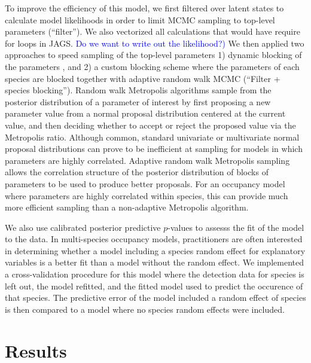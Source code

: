 \documentclass[12pt]{article}
\newcommand{\flagged}[1] {
  \textcolor{blue}{#1}
}
\begin{document}
To improve the efficiency of this model, we first filtered over latent
states to calculate model likelihoods in order to limit MCMC sampling
to top-level parameters (``filter''). We also vectorized all
calculations that would have require for loops in JAGS. \flagged{Do we
  want to write out the likelihood?)} We then applied two approaches
to speed sampling of the top-level parameters 1) dynamic blocking of
the parameters \citep[``filter + autoblocking'',
][]{turek2016efficient}, and 2) a custom blocking scheme where the
parameters of each species are blocked together with adaptive random
walk MCMC (``Filter + species blocking''). Random walk Metropolis
algorithms \citep{metropolis1953equation} sample from the posterior
distribution of a parameter of interest by first proposing a new
parameter value from a normal proposal distribution centered at the
current value, and then deciding whether to accept or reject the
proposed value via the Metropolis ratio.  Although common, standard
univariate or multivariate normal proposal distributions can prove to
be inefficient at sampling for models in which parameters are highly
correlated.  Adaptive random walk Metropolis sampling
\citep{haario98anadaptive} allows the correlation structure of the
posterior distribution of blocks of parameters to be used to produce
better proposals.  For an occupancy model where parameters are highly
correlated within species, this can provide much more efficient
sampling than a non-adaptive Metropolis algorithm.

We also use calibrated posterior predictive $p$-values
\citep{hjort-etal-06} to assesss the fit of the model to the data.  In
multi-species occupancy models, practitioners are often interested in
determining whether a model including a species random effect for
explanatory variables is a better fit than a model without the random
effect. We implemented a cross-validation procedure for this model
where the detection data for species is left out, the model refitted,
and the fitted model used to predict the occurence of that
species. The predictive error of the model included a random effect of
species is then compared to a model where no species random effects
were included.


\section*{Results}
\label{sec:results}
\end{document}
